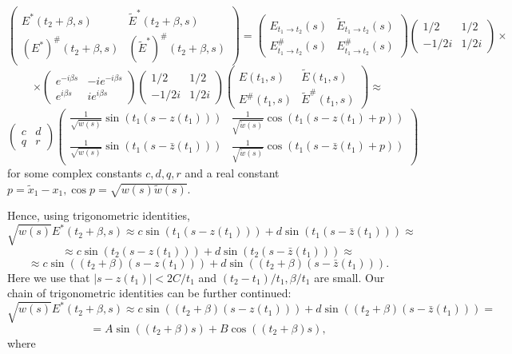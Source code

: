 \documentclass[11pt,twoside,reqno]{amsart}
\def\ti{\tilde}
\def\to{\rightarrow}
\def\b{\beta}
\theoremstyle{plain}
\numberwithin{equation}{section}
\begin{document}
$$\begin{pmatrix} E^*(t_2+\beta,s) & \ti E^*(t_2+\beta,s) \\ (E^*)^\#(t_2+\beta,s) &( \ti E^*)^\#(t_2+\beta,s) \end{pmatrix}=\begin{pmatrix} E_{t_1\to t_2}(s) & \ti E_{t_1\to t_2}(s) \\ E^\#_{t_1\to t_2}(s)& E^\#_{t_1\to t_2}(s) \end{pmatrix}\begin{pmatrix} 1/2 & 1/2 \\ -1/2i & 1/2i \end{pmatrix}\times$$$$
\times\begin{pmatrix} e^{-i\beta s} & -ie^{-i\beta s} \\ e^{i\beta s}  & ie^{i\beta s} \end{pmatrix}\begin{pmatrix} 1/2 & 1/2 \\ -1/2i & 1/2i \end{pmatrix}\begin{pmatrix} E(t_1,s) & \ti E(t_1,s) \\ E^\#(t_1,s) & \ti E^\#(t_1,s) \end{pmatrix}\approx
$$\begin{equation}
\begin{pmatrix} c & d \\ q & r \end{pmatrix}\begin{pmatrix} \frac 1{\sqrt{w(s)}}\sin (t_1(s-z(t_1))) &  \frac 1{\sqrt{\ti w(s)}}\cos (t_1(s-z(t_1)+p))  \\  \frac 1{\sqrt{w(s)}}\sin (t_1(s-\bar z(t_1))) & \frac 1{\sqrt{\ti w(s)}} \cos (t_1(s-\bar z(t_1)+p))  \end{pmatrix}
\label{eqMat}\end{equation}
for some complex constants $c,d,q,r$ and a real constant $p=\ti x_1-x_1,\cos p =\sqrt{w(s)\ti w(s)}$.

Hence, using trigonometric identities,
$$\sqrt{w(s)}E^*(t_2+\beta,s)\approx c \sin (t_1(s-z(t_1))) +d\sin (t_1(s-\bar z(t_1)))\approx$$$$
\approx c \sin (t_2(s-z(t_1))) +d\sin (t_2(s-\bar z(t_1)))\approx$$$$
\approx c \sin ((t_2+\b)(s-z(t_1))) +d\sin ((t_2+\b)(s-\bar z(t_1))).$$
Here we use that $|s-z(t_1)|<2C/t_1$ and $(t_2-t_1)/t_1, \b/t_1$ are small.
Our chain of trigonometric identities can be further continued:
$$\sqrt{w(s)}E^*(t_2+\beta,s)\approx c \sin ((t_2+\b)(s-z(t_1))) +d\sin ((t_2+\b)(s-\bar z(t_1)))=$$$$
= A\sin((t_2+\b)s)+B\cos((t_2+\b)s),$$
where 
\end{document}
